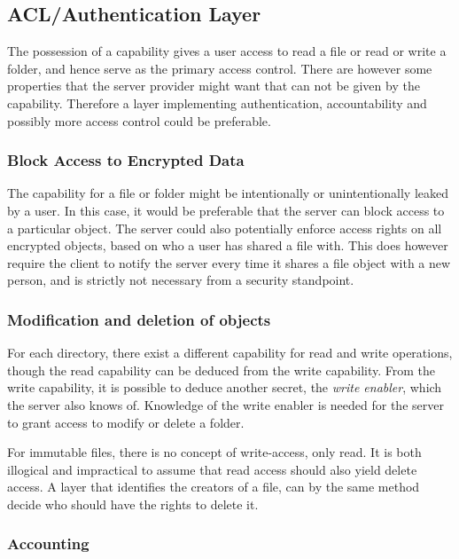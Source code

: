 \documentclass[pdftex,english,10pt,b5paper,twoside]{book}
\begin{document}
\subsection{ACL/Authentication Layer}

The possession of a capability gives a user access to read a file or read or
write a folder, and hence serve as the primary access control. There are
however some properties that the server provider might want that can not be
given by the capability. Therefore a layer implementing authentication,
accountability and possibly more access control could be preferable.

\subsubsection{Block Access to Encrypted Data}

The capability for a file or folder might be intentionally or unintentionally
leaked by a user. In this case, it would be preferable that the server can
block access to a particular object. The server could also potentially enforce
access rights on all encrypted objects, based on who a user has shared a file
with. This does however require the client to notify the server every time it
shares a file object with a new person, and is strictly not necessary from a
security standpoint.

\subsubsection{Modification and deletion of objects}

For each directory, there exist a different capability for read and write
operations, though the read capability can be deduced from the write
capability. From the write capability, it is possible to deduce another secret,
the \emph{write enabler}, which the server also knows of.  Knowledge of the
write enabler is needed for the server to grant access to modify or delete a
folder.

For immutable files, there is no concept of write-access, only read. It is both
illogical and impractical to assume that read access should also yield delete
access. A layer that identifies the creators of a file, can by the same method
decide who should have the rights to delete it.

\subsubsection{Accounting}
\end{document}
